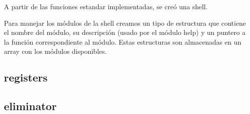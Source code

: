 \documentclass{article}
\begin{document}
A partir de las funciones estandar implementadas, se creó una shell. 

Para manejar los módulos de la shell creamos un tipo de estructura que contiene el nombre del módulo, su descripción (usado por el módulo help) y un puntero a la función correspondiente al módulo. Estas estructuras son almacenadas en un array con los módulos disponibles.

\subsection {registers}
\subsection {eliminator}
\end{document}
